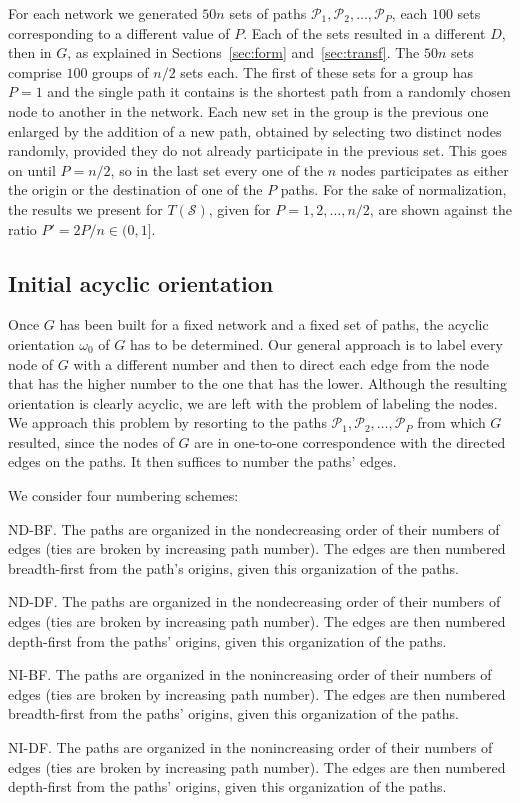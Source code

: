 \documentclass{article}
\begin{document}
For each network we generated $50n$ sets of paths
$\mathcal{P}_1,\mathcal{P}_2,\ldots,\mathcal{P}_P$, each $100$ sets
corresponding to a different value of $P$. Each of the sets resulted in a
different $D$, then in $G$, as explained in Sections~\ref{sec:form}
and~\ref{sec:transf}. The $50n$ sets comprise $100$ groups of $n/2$ sets each.
The first of these sets for a group has $P=1$ and the single path it contains is
the shortest path from a randomly chosen node to another in the network. Each
new set in the group is the previous one enlarged by the addition of a new path,
obtained by selecting two distinct nodes randomly, provided they do not already
participate in the previous set. This goes on until $P=n/2$, so in the last set
every one of the $n$ nodes participates as either the origin or the destination
of one of the $P$ paths. For the sake of normalization, the results we present
for $T(\mathcal{S})$, given for $P=1,2,\ldots,n/2$, are shown against the ratio
$P'=2P/n\in(0,1]$.

\subsection{Initial acyclic orientation}

Once $G$ has been built for a fixed network and a fixed set of paths, the
acyclic orientation $\omega_0$ of $G$ has to be determined. Our general approach
is to label every node of $G$ with a different number and then to direct each
edge from the node that has the higher number to the one that has the lower.
Although the resulting orientation is clearly acyclic, we are left with the
problem of labeling the nodes. We approach this problem by resorting to the
paths $\mathcal{P}_1,\mathcal{P}_2,\ldots,\mathcal{P}_P$ from which $G$
resulted, since the nodes of $G$ are in one-to-one correspondence with the
directed edges on the paths. It then suffices to number the paths' edges.

We consider four numbering schemes:
\begin{list}{}{}
\item[ND-BF.] The paths are organized in the nondecreasing order of their
numbers of edges (ties are broken by increasing path number). The edges are then
numbered breadth-first from the path's origins, given this organization of the
paths.
\item[ND-DF.] The paths are organized in the nondecreasing order of their
numbers of edges (ties are broken by increasing path number). The edges are then
numbered depth-first from the paths' origins, given this organization of the
paths.
\item[NI-BF.] The paths are organized in the nonincreasing order of their
numbers of edges (ties are broken by increasing path number). The edges are then
numbered breadth-first from the paths' origins, given this organization of the
paths.
\item[NI-DF.] The paths are organized in the nonincreasing order of their
numbers of edges (ties are broken by increasing path number). The edges are then
numbered depth-first from the paths' origins, given this organization of the
paths.
\end{list}
\end{document}
